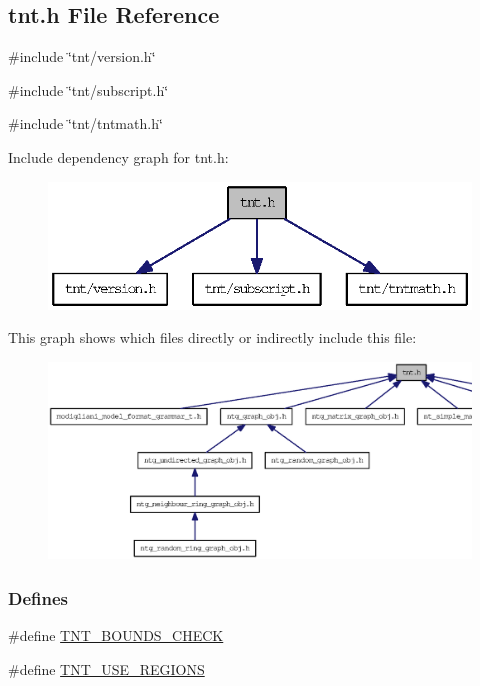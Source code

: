 \subsection{tnt.h File Reference}
\label{tnt_8h}
{\ttfamily \#include \char`\"{}tnt/version.h\char`\"{}}\par
{\ttfamily \#include \char`\"{}tnt/subscript.h\char`\"{}}\par
{\ttfamily \#include \char`\"{}tnt/tntmath.h\char`\"{}}\par
Include dependency graph for tnt.h:
\nopagebreak
\begin{figure}[H]
\begin{center}
\leavevmode
\includegraphics[width=322pt]{tnt_8h__incl}
\end{center}
\end{figure}
This graph shows which files directly or indirectly include this file:
\nopagebreak
\begin{figure}[H]
\begin{center}
\leavevmode
\includegraphics[width=400pt]{tnt_8h__dep__incl}
\end{center}
\end{figure}
\subsubsection*{Defines}
\begin{DoxyCompactItemize}
\item 
\#define \hyperlink{tnt_8h_ac2c4dfa6823437464bb5b871c31dbd0b}{TNT\_\-BOUNDS\_\-CHECK}
\item 
\#define \hyperlink{tnt_8h_a37800f21c47f9b2d80bcd2ca10fde8b0}{TNT\_\-USE\_\-REGIONS}
\end{DoxyCompactItemize}


